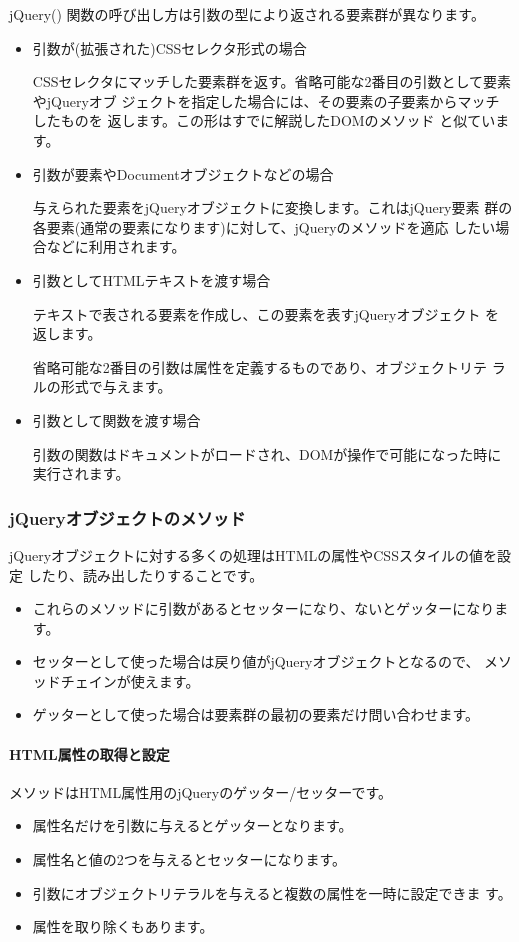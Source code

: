jQuery() 関数の呼び出し方は引数の型により返される要素群が異なります。
\begin{itemize}
 \item 引数が(拡張された)CSSセレクタ形式の場合

 CSSセレクタにマッチした要素群を返す。省略可能な2番目の引数として要素やjQueryオブ
       ジェクトを指定した場合には、その要素の子要素からマッチしたものを
       返します。この形はすでに解説したDOMのメソッド
       と似ています。
 \item 引数が要素やDocumentオブジェクトなどの場合

       与えられた要素をjQueryオブジェクトに変換します。これはjQuery要素
       群の各要素(通常の要素になります)に対して、jQueryのメソッドを適応
       したい場合などに利用されます。
 \item 引数としてHTMLテキストを渡す場合

       テキストで表される要素を作成し、この要素を表すjQueryオブジェクト
       を返します。%

       省略可能な2番目の引数は属性を定義するものであり、オブジェクトリテ
       ラルの形式で与えます。
 \item 引数として関数を渡す場合

       引数の関数はドキュメントがロードされ、DOMが操作で可能になった時に
       実行されます。
\end{itemize}
\subsubsection{jQueryオブジェクトのメソッド}\label{jQueryMethod}
jQueryオブジェクトに対する多くの処理はHTMLの属性やCSSスタイルの値を設定
したり、読み出したりすることです。
\begin{itemize}
 \item これらのメソッドに引数があるとセッターになり、ないとゲッターになります。
 \item セッターとして使った場合は戻り値がjQueryオブジェクトとなるので、
       メソッドチェインが使えます。
 \item ゲッターとして使った場合は要素群の最初の要素だけ問い合わせます。
\end{itemize}
\paragraph{HTML属性の取得と設定}
メソッドはHTML属性用のjQueryのゲッター/セッターです。
\begin{itemize}
 \item 属性名だけを引数に与えるとゲッターとなります。
 \item 属性名と値の2つを与えるとセッターになります。
 \item 引数にオブジェクトリテラルを与えると複数の属性を一時に設定できま
			 す。
 \item 属性を取り除くもあります。
\end{itemize}
